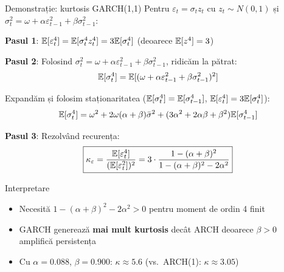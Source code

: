 \documentclass[9pt, aspectratio=169, t]{beamer}
\begin{document}
\begin{frame}{Demonstrație: kurtosis GARCH(1,1)}
    \small
        Pentru $\varepsilon_t = \sigma_t z_t$ cu $z_t \sim N(0,1)$ și $\sigma_t^2 = \omega + \alpha \varepsilon_{t-1}^2 + \beta \sigma_{t-1}^2$:

        \textbf{Pasul 1}: $\mathbb{E}[\varepsilon_t^4] = \mathbb{E}[\sigma_t^4 z_t^4] = 3\mathbb{E}[\sigma_t^4]$ (deoarece $\mathbb{E}[z^4] = 3$)

        \textbf{Pasul 2}: Folosind $\sigma_t^2 = \omega + \alpha \varepsilon_{t-1}^2 + \beta \sigma_{t-1}^2$, ridicăm la pătrat:
        \vspace{-2mm}
        \[
            \mathbb{E}[\sigma_t^4] = \mathbb{E}[(\omega + \alpha\varepsilon_{t-1}^2 + \beta\sigma_{t-1}^2)^2]
        \]
        \vspace{-2mm}

        Expandăm și folosim staționaritatea ($\mathbb{E}[\sigma_t^4] = \mathbb{E}[\sigma_{t-1}^4]$, $\mathbb{E}[\varepsilon_t^4] = 3\mathbb{E}[\sigma_t^4]$):
        \vspace{-2mm}
        \[
            \mathbb{E}[\sigma_t^4] = \omega^2 + 2\omega(\alpha+\beta)\bar{\sigma}^2 + (3\alpha^2 + 2\alpha\beta + \beta^2)\mathbb{E}[\sigma_{t-1}^4]
        \]
        \vspace{-2mm}

        \textbf{Pasul 3}: Rezolvând recurența:
        \vspace{-2mm}
        \[
            \boxed{\kappa_{\varepsilon} = \frac{\mathbb{E}[\varepsilon_t^4]}{(\mathbb{E}[\varepsilon_t^2])^2} = 3 \cdot \frac{1 - (\alpha+\beta)^2}{1 - (\alpha+\beta)^2 - 2\alpha^2}}
        \]
        \vspace{-1mm}
        \begin{block}{Interpretare}
            \begin{itemize}
                \item Necesită $1 - (\alpha+\beta)^2 - 2\alpha^2 > 0$ pentru moment de ordin 4 finit
                \item GARCH generează \textbf{mai mult kurtosis} decât ARCH deoarece $\beta > 0$ amplifică persistența
                \item Cu $\alpha = 0.088$, $\beta = 0.900$: $\kappa \approx 5.6$ (vs.\ ARCH(1): $\kappa \approx 3.05$)
            \end{itemize}
        \end{block}
\end{frame}
\end{document}

